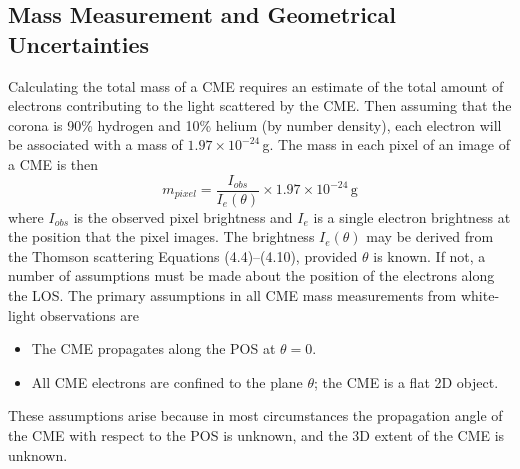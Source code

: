 \subsection{Mass Measurement and Geometrical Uncertainties}
%
%
%
Calculating the total mass of a CME requires an estimate of the total amount of electrons contributing to the light scattered by the CME. Then assuming that the corona is 90\% hydrogen and 10\% helium (by number density), each electron will be associated with a mass of $1.97\times10^{-24}$\,g. The mass in each pixel of an image of a CME is then
\begin{equation}
m_{pixel}=\frac{I_{obs}}{I_e(\theta)} \times1.97\times10^{-24}\,\mathrm{g}
\label{eqn:mass_pix}
\end{equation}
where $I_{obs}$ is the observed pixel brightness and $I_e$ is a single electron brightness at the position that the pixel images.
The brightness $I_e(\theta)$ may be derived from the Thomson scattering Equations (4.4)--(4.10), provided $\theta$ is known. If not, a number of assumptions must be made about the position of the electrons along the LOS. The primary assumptions in all CME mass measurements from white-light observations are
%
%
\begin{itemize}
\item The CME propagates along the POS at $\theta=0$.
\item All CME electrons are confined to the plane $\theta$; the CME is a flat 2D object.
\end{itemize}
These assumptions arise because in most circumstances the propagation angle of the CME with respect to the POS is unknown, and the 3D extent of the CME is unknown.
